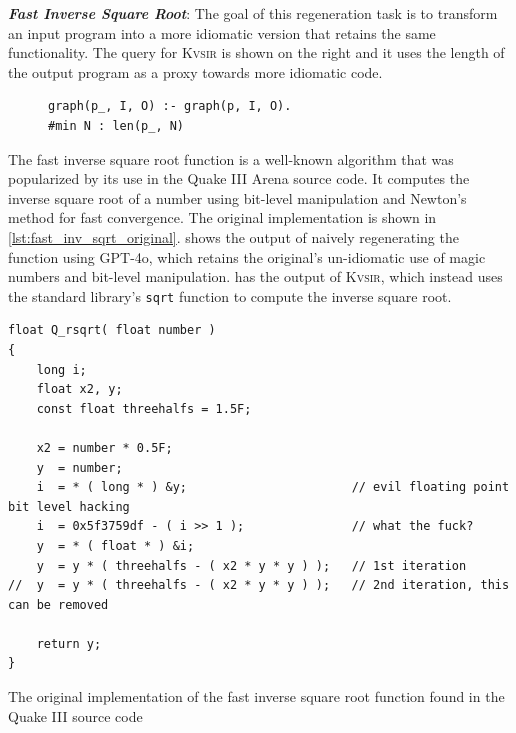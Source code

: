 \documentclass[sigplan,review,anonymous,10pt]{acmart}
\def\gptmodel{{GPT-4o}\xspace}
\newcommand{\sys}{{\scshape Kv{\textalpha}sir}\xspace}
\newcommand{\heading}[1]{\vspace{2pt}\noindent\textbf{\emph{#1}}:\enspace}
\newcommand{\ttt}[1]{\texttt{#1}\xspace}
\begin{document}
\heading{Fast Inverse Square Root}
The goal of this regeneration task is to transform an input 
program into a more idiomatic version that retains the same functionality.
The query for \sys is shown on the right and it uses the length of the output program as a proxy towards 
more idiomatic code.
\begin{figure}
\begin{verbatim}
graph(p_, I, O) :- graph(p, I, O).
#min N : len(p_, N)
\end{verbatim}
\end{figure}
The fast inverse square root function is a well-known algorithm that was
popularized by its use in the Quake III Arena source code.
It computes the inverse square root of a number using bit-level manipulation and
Newton's method for fast convergence.
The original implementation is shown in \cref{lst:fast_inv_sqrt_original}.
 shows the output of naively regenerating the function using \gptmodel,
which retains the original's un-idiomatic use of magic numbers and bit-level manipulation.
 has the output of \sys, which instead uses the standard library's
\ttt{sqrt} function to compute the inverse square root.

\begin{listing}[htpb]
\begin{verbatim}
float Q_rsqrt( float number )
{
	long i;
	float x2, y;
	const float threehalfs = 1.5F;

	x2 = number * 0.5F;
	y  = number;
	i  = * ( long * ) &y;                       // evil floating point bit level hacking
	i  = 0x5f3759df - ( i >> 1 );               // what the fuck?
	y  = * ( float * ) &i;
	y  = y * ( threehalfs - ( x2 * y * y ) );   // 1st iteration
//	y  = y * ( threehalfs - ( x2 * y * y ) );   // 2nd iteration, this can be removed

	return y;
}
\end{verbatim}
  \caption{The original implementation of the fast inverse square root function 
  found in the Quake III source code~\cite{fast_inv_sqrt}}
  \label{lst:fast_inv_sqrt_original}
\end{listing}
\end{document}
